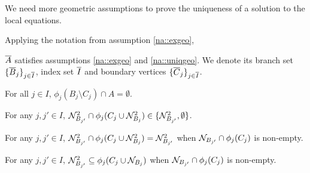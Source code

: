 \lin

We need more geometric assumptions to prove the uniqueness of a solution to the local equations.

\lin

\begin{nassu}
\label{na::uniqgeo}
Applying the notation from assumption \ref{na::exgeo},

\begin{subnassu}
\label{uniqgeo::induct}

\(\overline{A}\) satisfies assumptions \ref{na::exgeo} and \ref{na::uniqgeo}. We denote its branch set \(\{\overline{B}_j\}_{j \in \overline{I}}\), index set \(\overline{I}\) and boundary vertices \(\{\overline{C}_j\}_{j\in\overline{I}}\). 
\end{subnassu}

\begin{subnassu}
\label{uniqgeo::exB}

For all \(j \in I\), \(\phi_j(B_j\setminus C_j) \cap A = \emptyset\).
\end{subnassu}
\begin{subnassu}
\label{uniqgeo::dnmix}

For any \(j,j' \in I\), \(\mathcal{N}^2_{B_{j'}}\cap\phi_j(C_j\cup\mathcal{N}^2_{B_j}) \in \{\mathcal{N}^2_{B_{j'}},\emptyset\}\).
\end{subnassu}

\begin{subnassu}
\label{uniqgeo::weakdnmix}

For any \(j,j' \in I\), \(\mathcal{N}^2_{B_{j'}}\cap\phi_j(C_j\cup\mathcal{N}^2_{B_j}) = \mathcal{N}^2_{B_{j'}}\) when \(\mathcal{N}_{B_{j'}}\cap\phi_j(C_j)\) is non-empty. 
\end{subnassu}

\begin{subnassu}
\label{uniqgeo::specificdnmix}

For any \(j,j' \in I\), \(\mathcal{N}^2_{B_{j'}}\subseteq \phi_j(C_j\cup\mathcal{N}_{B_j})\) when \(\mathcal{N}_{B_{j'}}\cap\phi_j(C_j)\) is non-empty.
\end{subnassu}

\begin{subnassu}
\label{uniqgeo::invdnmix}


\end{subnassu}
\end{nassu}
